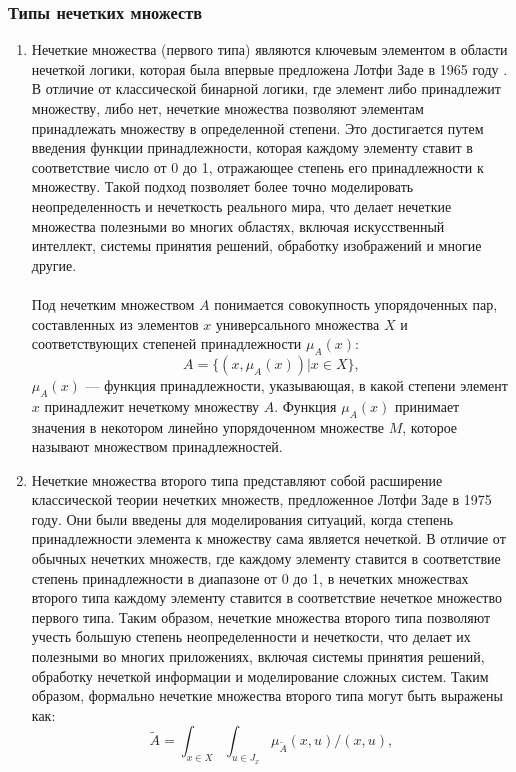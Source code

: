 \documentclass{article}
\begin{document}
    \subsubsection{Типы нечетких множеств}
    \begin{enumerate}
        \item Нечеткие множества (первого типа) являются ключевым элементом в области нечеткой логики, которая была впервые предложена Лотфи Заде в 1965 году \cite{litlink21}. В отличие от классической бинарной логики, где элемент либо принадлежит множеству, либо нет, нечеткие множества позволяют элементам принадлежать множеству в определенной степени. Это достигается путем введения функции принадлежности, которая каждому элементу ставит в соответствие число от 0 до 1, отражающее степень его принадлежности к множеству. Такой подход позволяет более точно моделировать неопределенность и нечеткость реального мира, что делает нечеткие множества полезными во многих областях, включая искусственный интеллект, системы принятия решений, обработку изображений и многие другие.\\
        ~\\
        Под нечетким множеством $A$ понимается совокупность упорядоченных пар, составленных из элементов $x$ универсального множества $X$ и соответствующих степеней принадлежности $\mu_A(x)$:\\
        $$A=\{(x, \mu_A(x)) | x \in X\},$$
        $\mu_A(x)$ — функция принадлежности, указывающая, в какой степени элемент $x$ принадлежит нечеткому множеству $A$. Функция $\mu_A(x)$ принимает значения в некотором линейно упорядоченном множестве $M$, которое называют множеством принадлежностей.
        \item Нечеткие множества второго типа представляют собой расширение классической теории нечетких множеств, предложенное Лотфи Заде в 1975 году. Они были введены для моделирования ситуаций, когда степень принадлежности элемента к множеству сама является нечеткой. В отличие от обычных нечетких множеств, где каждому элементу ставится в соответствие степень принадлежности в диапазоне от 0 до 1, в нечетких множествах второго типа каждому элементу ставится в соответствие нечеткое множество первого типа. Таким образом, нечеткие множества второго типа позволяют учесть большую степень неопределенности и нечеткости, что делает их полезными во многих приложениях, включая системы принятия решений, обработку нечеткой информации и моделирование сложных систем. Таким образом, формально нечеткие множества второго типа могут быть выражены как:
        $$\tilde{A}=\int_{x\in X}\int_{u\in J_{x}} \mu_{\tilde{A}}(x,u) / (x,u),$$

\end{enumerate}
\end{document}
